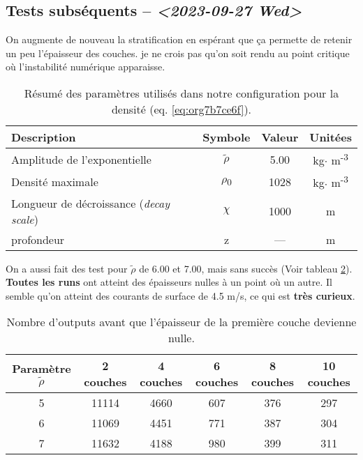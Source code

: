\documentclass[10pt]{article}
\numberwithin{equation}{section}
\begin{document}
\subsection{Tests subséquents -- \textit{<2023-09-27 Wed>}}
\label{sec:org4ffb7e8}

On augmente de nouveau la stratification en espérant que ça permette de retenir un peu l'épaisseur des couches.
je ne crois pas qu'on soit rendu au point critique où l'instabilité numérique apparaisse. 
\begin{table}[htbp]
\caption{\label{tab:org2c138ec}Résumé des paramètres utilisés dans notre configuration pour la densité (eq. \ref{eq:org7b7ce6f}).}
\centering
\begin{tabular}{lccc}
\hline
\hline
Description & Symbole & Valeur & Unitées\\[0pt]
\hline
Amplitude de l'exponentielle & \(\tilde{\rho}\) & 5.00 & kg\(\cdot\) m\textsuperscript{-3}\\[0pt]
Densité maximale & \(\rho\)\textsubscript{0} & 1028 & kg\(\cdot\) m\textsuperscript{-3}\\[0pt]
Longueur de décroissance (\emph{decay scale}) & \(\chi\) & 1000 & m\\[0pt]
profondeur & z & --- & m\\[0pt]
\hline
\end{tabular}
\end{table}

On a aussi fait des test pour \(\tilde{\rho}\) de 6.00 et 7.00, mais sans succès (Voir tableau \ref{tab:org9e7d420}).
\textbf{Toutes les runs} ont atteint des épaisseurs nulles à un point où un autre.
Il semble qu'on atteint des courants de surface de 4.5 m/s, ce qui est \textbf{très curieux}.

\begin{table}[htbp]
\caption{\label{tab:org9e7d420}Nombre d'outputs avant que l'épaisseur de la première couche devienne nulle.}
\centering
\begin{tabular}{cccccc}
\hline
\hline
Paramètre \(\tilde{\rho}\) & 2 couches & 4 couches & 6 couches & 8 couches & 10 couches\\[0pt]
\hline
5 & 11114 & 4660 & 607 & 376 & 297\\[0pt]
6 & 11069 & 4451 & 771 & 387 & 304\\[0pt]
7 & 11632 & 4188 & 980 & 399 & 311\\[0pt]
\hline
\end{tabular}
\end{table}
\end{document}
